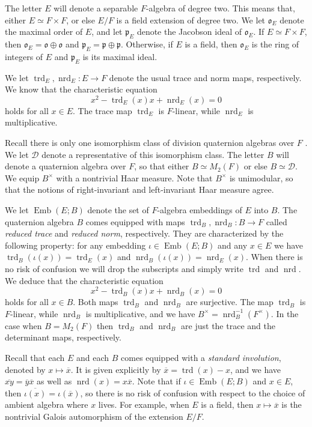 \documentclass{article}
\theoremstyle{named}
\newcommand{\D}{\mathcal{D}}
\renewcommand{\o}{\mathfrak{o}}
\newcommand{\p}{\mathfrak{p}}
\DeclareMathOperator{\Emb}{Emb}
\DeclareMathOperator{\nrd}{nrd}
\DeclareMathOperator{\trd}{trd}
\begin{document}
The letter $E$ will denote a separable $F$-algebra of degree two. This means that, either $E \simeq F \times F$, or else $E/F$ is a field extension of degree two. We let $\o_E$ denote the maximal order of $E$, and let $\p_E$ denote the Jacobson ideal of $\o_E$. If $E \simeq F \times F$, then $\o_E = \o \oplus \o$ and $\p_E = \p \oplus \p$. Otherwise, if $E$ is a field, then $\o_E$ is the ring of integers of $E$ and $\p_E$ is its maximal ideal.

We let $\trd_E, \nrd_E : E \rightarrow F$ denote the usual trace and norm maps, respectively. We know that the characteristic equation
\begin{equation*}
    x^2 - \trd_E(x)x + \nrd_E(x) = 0
\end{equation*}
holds for all $x \in E$. The trace map $\trd_E$ is $F$-linear, while $\nrd_E$ is multiplicative.

Recall there is only one isomorphism class of division quaternion algebras over $F$ \cite[Theorem 13.3.11]{voight}. We let $\D$ denote a representative of this isomorphism class. The letter $B$ will denote a quaternion algebra over $F$, so that either $B \simeq M_2(F)$ or else $B \simeq \D$. We equip $B^\times$ with a nontrivial Haar measure. Note that $B^\times$ is unimodular, so that the notions of right-invariant and left-invariant Haar measure agree. 

We let $\Emb(E; B)$ denote the set of $F$-algebra embeddings of $E$ into $B$. The quaternion algebra $B$ comes equipped with maps $\trd_B, \nrd_B: B\rightarrow F$ called \emph{reduced trace} and \emph{reduced norm}, respectively. They are characterized by the following property: for any embedding $\iota \in \Emb(E; B)$ and any $x \in E$ we have $\trd_B(\iota(x)) = \trd_E(x)$ and $\nrd_B(\iota(x)) = \nrd_E(x)$. When there is no risk of confusion we will drop the subscripts and simply write $\trd$ and $\nrd$. We deduce that the characteristic equation 
\begin{equation*}
    x^2 - \trd_B(x)x + \nrd_B(x) = 0
\end{equation*}
holds for all $x \in B$. Both maps $\trd_B$ and $\nrd_B$ are surjective. The map $\trd_B$ is $F$-linear, while $\nrd_B$ is multiplicative, and we have $B^\times = \nrd_B^{-1}(F^\times)$. In the case when $B = M_2(F)$ then $\trd_B$ and $\nrd_B$ are just the trace and the determinant maps, respectively.

Recall that each $E$ and each $B$ comes equipped with a \emph{standard involution}, denoted by $x\mapsto \overline{x}$. It is given explicitly by $\overline{x} = \trd(x) - x$, and we have $\overline{xy} = \overline{y}\overline{x}$ as well as $\nrd(x) = x\overline{x}$. Note that if $\iota \in \Emb(E; B)$ and $x \in E$, then $\overline{\iota(x)} = \iota(\overline{x})$, so there is no risk of confusion with respect to the choice of ambient algebra where $x$ lives. For example, when $E$ is a field, then $x \mapsto \overline{x}$ is the nontrivial Galois automorphism of the extension $E/F$. 
\end{document}
